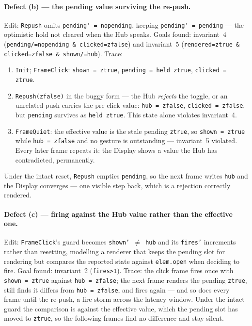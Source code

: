 \documentclass[a4paper,10pt,fleqn]{article}
\begin{document}
\paragraph{Defect (b) --- the pending value surviving the re-push.}
Edit: \texttt{Repush} omits \texttt{pending' = nopending}, keeping
\texttt{pending' = pending} --- the optimistic hold not cleared when the Hub
speaks.  Goals found: invariant~4 (\texttt{pending/=nopending \&
 clicked=zfalse})
and invariant~5 (\texttt{rendered=ztrue \& clicked=zfalse \& shown/=hub}).
Trace:
\begin{enumerate}
  \item \texttt{Init}; \texttt{FrameClick}: \texttt{shown = ztrue},
    \texttt{pending = held~ztrue}, \texttt{clicked = ztrue}.
  \item \texttt{Repush(zfalse)} in the buggy form --- the Hub \emph{rejects}
    the toggle, or an unrelated push carries the pre-click value:
    \texttt{hub = zfalse}, \texttt{clicked = zfalse}, but \texttt{pending}
    survives as \texttt{held~ztrue}.  This state alone violates invariant~4.
  \item \texttt{FrameQuiet}: the effective value is the stale
    pending \texttt{ztrue}, so \texttt{shown = ztrue} while
    \texttt{hub = zfalse} and no gesture is outstanding --- invariant~5
    violated.  Every later frame repeats it: the Display shows a value the Hub
    has contradicted, permanently.
\end{enumerate}
Under the intact reset, \texttt{Repush} empties \texttt{pending}, so the next
frame writes \texttt{hub} and the Display converges --- one visible step back,
which is a rejection correctly rendered.

\paragraph{Defect (c) --- firing against the Hub value rather than the
effective one.}
Edit: \texttt{FrameClick}'s guard becomes \texttt{shown' $\neq$ hub} and its
\texttt{fires'} increments rather than resetting, modelling a renderer that
keeps the pending slot for rendering but compares the reported state against
\texttt{elem.open} when deciding to fire.  Goal found: invariant~2
(\texttt{fires>1}).  Trace: the click frame fires once with
\texttt{shown = ztrue} against \texttt{hub = zfalse}; the next frame renders
the pending \texttt{ztrue}, still finds it differs from \texttt{hub = zfalse},
and fires again --- and so does every frame until the re-push, a fire storm
across the latency window.  Under the intact guard the comparison is against
the effective value, which the pending slot has moved to \texttt{ztrue}, so the
following frames find no difference and stay silent.
\end{document}
